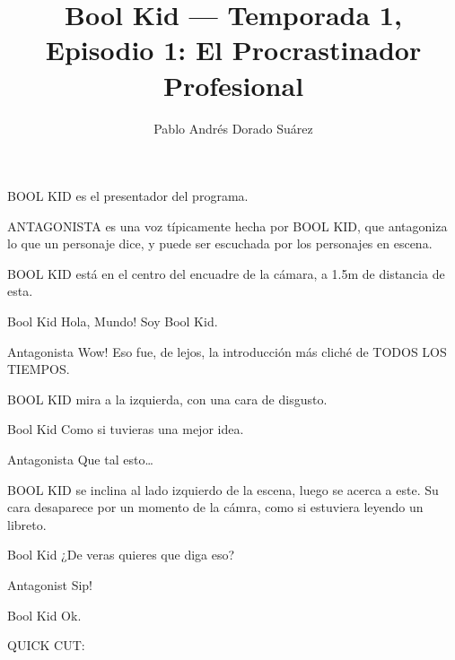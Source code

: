 \documentclass{screenplay}[2018/01/07]
\title{Bool Kid — Temporada 1, Episodio 1: El Procrastinador Profesional}
\author{Pablo Andrés Dorado Suárez}
\begin{document}
    \coverpage

    \fadein
    BOOL KID es el presentador del programa.

    ANTAGONISTA es una voz típicamente hecha por BOOL KID, que antagoniza lo que un personaje dice, y puede ser escuchada por los personajes en escena.

    \vspace{1em}
    \vspace{2em}


    BOOL KID está en el centro del encuadre de la cámara, a 1.5m de distancia de esta.

    \begin{dialogue}{Bool Kid}
        Hola, Mundo! Soy Bool Kid.
    \end{dialogue}

    \begin{dialogue}{Antagonista}
        Wow! Eso fue, de lejos, la introducción más cliché de TODOS LOS TIEMPOS.
    \end{dialogue}

    BOOL KID mira a la izquierda, con una cara de disgusto.

    \begin{dialogue}{Bool Kid}
        Como si tuvieras una mejor idea.
    \end{dialogue}

    \begin{dialogue}{Antagonista}
        Que tal esto\dots
    \end{dialogue}

    BOOL KID se inclina al lado izquierdo de la escena, luego se acerca a este. Su cara desaparece por un momento de la cámra, como si estuviera leyendo un libreto.

    \begin{dialogue}{Bool Kid}
        ¿De veras quieres que diga eso?
    \end{dialogue}

    \begin{dialogue}{Antagonist}
        Sip!
    \end{dialogue}

    \begin{dialogue}[sighing]{Bool Kid}
        Ok.
    \end{dialogue}

    \begin{flushright}
        QUICK CUT:
    \end{flushright}
\end{document}
